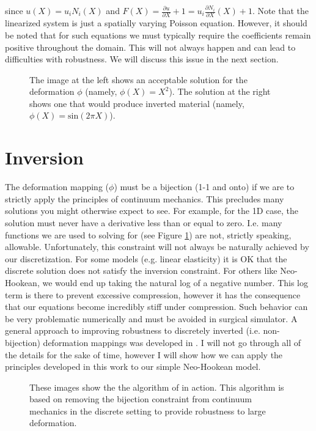 since $u(X)=u_iN_i(X)$ and $F(X)=\frac{\partial{u}}{\partial{X}}+1=u_i\frac{\partial{N_i}}{\partial{X}}(X)+1$. Note that the linearized system is just a spatially varying Poisson equation. However, it should be noted that for such equations we must typically require the coefficients remain positive throughout the domain. This will not always happen and can lead to difficulties with robustness. We will discuss this issue in the next section.
\begin{figure}
\caption{The image at the left shows an acceptable solution for the deformation $\phi$ (namely, $\phi(X)=X^2$). The solution at the right shows one that would produce inverted material (namely, $\phi(X)=\textrm{sin}(2\pi{X})$).}
\label{inversion}
\end{figure}
\section*{Inversion}
The deformation mapping ($\phi$) must be a bijection (1-1 and onto) if we are to strictly apply the principles of continuum mechanics. This precludes many solutions you might otherwise expect to see. For example, for the 1D case, the solution must never have a derivative less than or equal to zero. I.e. many functions we are used to solving for (see Figure \ref{inversion}) are not, strictly speaking, allowable. Unfortunately, this constraint will not always be naturally achieved by our discretization. For some models (e.g. linear elasticity) it is OK that the discrete solution does not satisfy the inversion constraint. For others like Neo-Hookean, we would end up taking the natural log of a negative number. This log term is there to prevent excessive compression, however it has the consequence that our equations become incredibly stiff under compression. Such behavior can be very problematic numerically and must be avoided in surgical simulator. A general approach to improving robustness to discretely inverted (i.e. non-bijection) deformation mappings was developed in \cite{Irving06}. I will not go through all of the details for the sake of time, however I will show how we can apply the principles developed in this work to our simple Neo-Hookean model.\\
\begin{figure}
\caption{These images show the the algorithm of \cite{Irving06} in action. This algorithm is based on removing the bijection constraint from continuum mechanics in the discrete setting to provide robustness to large deformation.}
\label{inversion2}
\end{figure}
